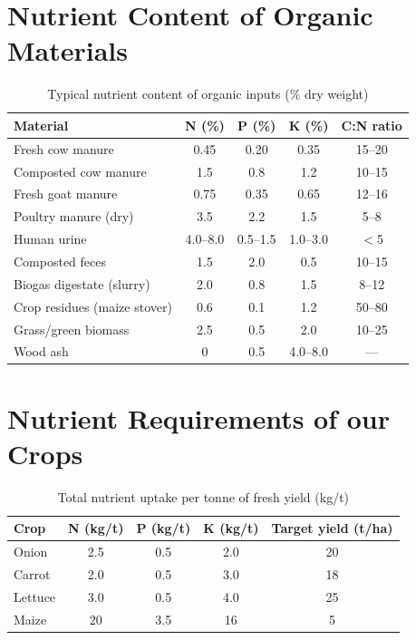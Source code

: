 \documentclass[12pt,a4paper,openany]{book}
\begin{document}
\section{Nutrient Content of Organic Materials}

\begin{table}[H]
\centering
\caption{Typical nutrient content of organic inputs (\% dry weight)}
\label{tab:nutrients}
\renewcommand{\arraystretch}{1.4}
\begin{tabular}{lcccc}
\toprule
\textbf{Material}&\textbf{N (\%)}&\textbf{P (\%)}&\textbf{K (\%)}&\textbf{C:N ratio}\\
\midrule
Fresh cow manure & 0.45 & 0.20 & 0.35 & 15--20\\
Composted cow manure & 1.5 & 0.8 & 1.2 & 10--15\\
Fresh goat manure & 0.75 & 0.35 & 0.65 & 12--16\\
Poultry manure (dry) & 3.5 & 2.2 & 1.5 & 5--8\\
Human urine & 4.0--8.0 & 0.5--1.5 & 1.0--3.0 & $<$5\\
Composted feces & 1.5 & 2.0 & 0.5 & 10--15\\
Biogas digestate (slurry) & 2.0 & 0.8 & 1.5 & 8--12\\
Crop residues (maize stover) & 0.6 & 0.1 & 1.2 & 50--80\\
Grass/green biomass & 2.5 & 0.5 & 2.0 & 10--25\\
Wood ash & 0 & 0.5 & 4.0--8.0 & — \\
\bottomrule
\end{tabular}
\end{table}

\section{Nutrient Requirements of our Crops}

\begin{table}[H]
\centering
\caption{Total nutrient uptake per tonne of fresh yield (kg/t)}
\label{tab:crop_nutrients}
\renewcommand{\arraystretch}{1.3}
\begin{tabular}{lcccc}
\toprule
\textbf{Crop}&\textbf{N (kg/t)}&\textbf{P (kg/t)}&\textbf{K (kg/t)}&\textbf{Target yield (t/ha)}\\
\midrule
Onion  & 2.5 & 0.5 & 2.0 & 20\\
Carrot & 2.0 & 0.5 & 3.0 & 18\\
Lettuce& 3.0 & 0.5 & 4.0 & 25\\
Maize  & 20 & 3.5 & 16 & 5\\
\bottomrule
\end{tabular}
\end{table}
\end{document}
